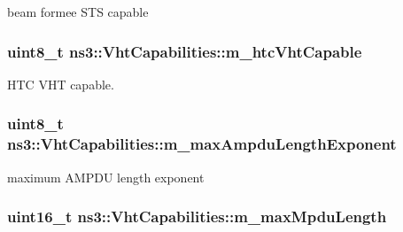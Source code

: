 beam formee S\+TS capable 

\subsubsection[{\texorpdfstring{m\+\_\+htc\+Vht\+Capable}{m_htcVhtCapable}}]{\setlength{\rightskip}{0pt plus 5cm}uint8\+\_\+t ns3\+::\+Vht\+Capabilities\+::m\+\_\+htc\+Vht\+Capable\hspace{0.3cm}{\ttfamily [private]}}\hypertarget{classns3_1_1VhtCapabilities_a026afef6660a4220b432ec4f1cefcd58}{}\label{classns3_1_1VhtCapabilities_a026afef6660a4220b432ec4f1cefcd58}


H\+TC V\+HT capable. 

\subsubsection[{\texorpdfstring{m\+\_\+max\+Ampdu\+Length\+Exponent}{m_maxAmpduLengthExponent}}]{\setlength{\rightskip}{0pt plus 5cm}uint8\+\_\+t ns3\+::\+Vht\+Capabilities\+::m\+\_\+max\+Ampdu\+Length\+Exponent\hspace{0.3cm}{\ttfamily [private]}}\hypertarget{classns3_1_1VhtCapabilities_aef0f011be7c0aa3224d22a93dfc5cc22}{}\label{classns3_1_1VhtCapabilities_aef0f011be7c0aa3224d22a93dfc5cc22}


maximum A\+M\+P\+DU length exponent 

\subsubsection[{\texorpdfstring{m\+\_\+max\+Mpdu\+Length}{m_maxMpduLength}}]{\setlength{\rightskip}{0pt plus 5cm}uint16\+\_\+t ns3\+::\+Vht\+Capabilities\+::m\+\_\+max\+Mpdu\+Length\hspace{0.3cm}{\ttfamily [private]}}\hypertarget{classns3_1_1VhtCapabilities_a50f9372914daf48375359a4159cd3ad0}{}\label{classns3_1_1VhtCapabilities_a50f9372914daf48375359a4159cd3ad0}


